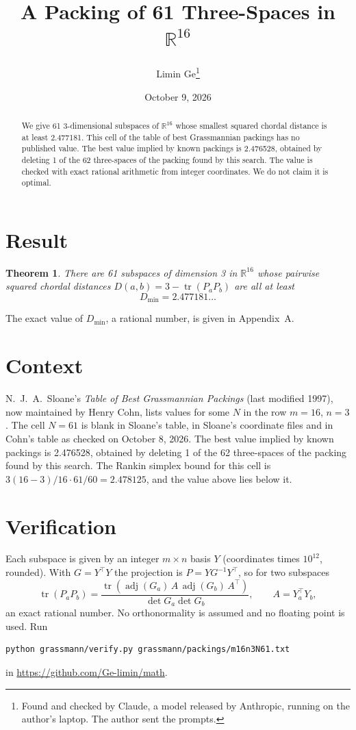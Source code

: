 \documentclass[11pt,a4paper]{article}
\title{A Packing of 61 Three-Spaces in $\mathbb{R}^{16}$}
\author{Limin Ge\thanks{Found and checked by Claude, a model released by Anthropic, running on the author's laptop. The author sent the prompts.}}
\date{October 9, 2026}
\newtheorem*{theorem}{Theorem}
\begin{document}
\maketitle
\begin{abstract}
We give 61 3-dimensional subspaces of $\mathbb{R}^{16}$ whose smallest squared chordal distance is at least 2.477181. This cell of the table of best Grassmannian packings has no published value. The best value implied by known packings is 2.476528, obtained by deleting 1 of the 62 three-spaces of the packing found by this search. The value is checked with exact rational arithmetic from integer coordinates. We do not claim it is optimal.
\end{abstract}

\section{Result}
\begin{theorem}
There are 61 subspaces of dimension 3 in $\mathbb{R}^{16}$ whose pairwise squared chordal distances $D(a,b) = 3 - \operatorname{tr}(P_aP_b)$ are all at least
\[ D_{\min} = 2.477181\ldots \]
\end{theorem}
The exact value of $D_{\min}$, a rational number, is given in Appendix~A.


\section{Context}
N.~J.~A.~Sloane's \emph{Table of Best Grassmannian Packings} (last modified 1997), now maintained by Henry Cohn, lists values for some $N$ in the row $m=16$, $n=3$. The cell $N=61$ is blank in Sloane's table, in Sloane's coordinate files and in Cohn's table as checked on October 8, 2026. The best value implied by known packings is 2.476528, obtained by deleting 1 of the 62 three-spaces of the packing found by this search. The Rankin simplex bound for this cell is $3(16-3)/16\cdot 61/60 = 2.478125$, and the value above lies below it.


\section{Verification}
Each subspace is given by an integer $m\times n$ basis $Y$ (coordinates times $10^{12}$, rounded). With $G=Y^\top Y$ the projection is $P=YG^{-1}Y^\top$, so for two subspaces
\[ \operatorname{tr}(P_aP_b)=\frac{\operatorname{tr}(\operatorname{adj}(G_a)\,A\,\operatorname{adj}(G_b)\,A^\top)}{\det G_a\det G_b},\qquad A=Y_a^\top Y_b, \]
an exact rational number. No orthonormality is assumed and no floating point is used. Run
\begin{verbatim}
python grassmann/verify.py grassmann/packings/m16n3N61.txt
\end{verbatim}
in \url{https://github.com/Ge-limin/math}.
\end{document}
